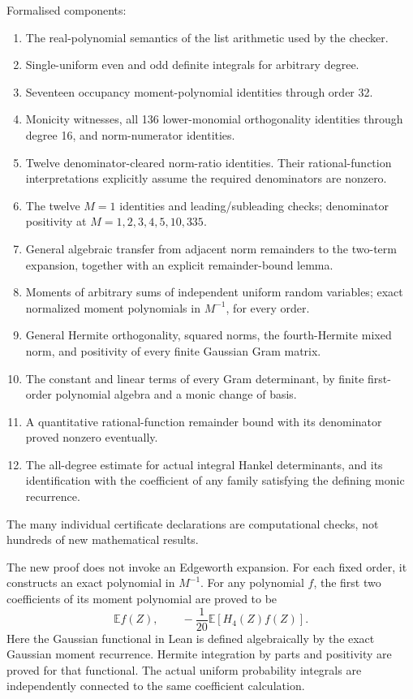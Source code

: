 \documentclass[11pt,a4paper]{article}
\newcommand{\E}{\mathbb E}
\begin{document}
Formalised components:
\begin{enumerate}
\item The real-polynomial semantics of the list arithmetic used by the checker.
\item Single-uniform even and odd definite integrals for arbitrary degree.
\item Seventeen occupancy moment-polynomial identities through order 32.
\item Monicity witnesses, all 136 lower-monomial orthogonality identities through degree 16, and norm-numerator identities.
\item Twelve denominator-cleared norm-ratio identities. Their rational-function interpretations explicitly assume the required denominators are nonzero.
\item The twelve $M=1$ identities and leading/subleading checks; denominator positivity at $M=1,2,3,4,5,10,335$.
\item General algebraic transfer from adjacent norm remainders to the two-term expansion, together with an explicit remainder-bound lemma.
\item Moments of arbitrary sums of independent uniform random variables; exact normalized moment polynomials in $M^{-1}$, for every order.
\item General Hermite orthogonality, squared norms, the fourth-Hermite mixed norm, and positivity of every finite Gaussian Gram matrix.
\item The constant and linear terms of every Gram determinant, by finite first-order polynomial algebra and a monic change of basis.
\item A quantitative rational-function remainder bound with its denominator proved nonzero eventually.
\item The all-degree estimate for actual integral Hankel determinants, and its identification with the coefficient of any family satisfying the defining monic recurrence.
\end{enumerate}
The many individual certificate declarations are computational checks, not hundreds of new mathematical results.

The new proof does not invoke an Edgeworth expansion. For each fixed order, it constructs an exact polynomial in $M^{-1}$. For any polynomial $f$, the first two coefficients of its moment polynomial are proved to be
\[
\E f(Z),\qquad -\frac1{20}\E[H_4(Z)f(Z)].
\]
Here the Gaussian functional in Lean is defined algebraically by the exact Gaussian moment recurrence. Hermite integration by parts and positivity are proved for that functional. The actual uniform probability integrals are independently connected to the same coefficient calculation.
\end{document}
